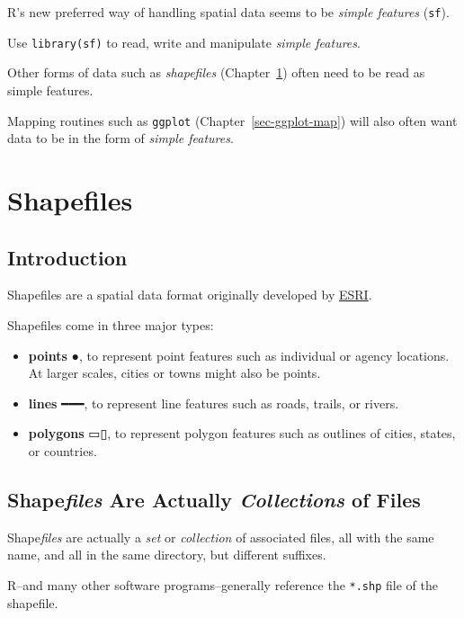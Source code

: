 \documentclass[
  letterpaper,
  DIV=11,
  numbers=noendperiod,
  oneside]{scrreprt}
\providecommand{\tightlist}{%
  \setlength{\itemsep}{0pt}\setlength{\parskip}{0pt}}\usepackage{longtable,booktabs,array}
\begin{document}
R's new preferred way of handling spatial data seems to be \emph{simple
features} (\texttt{sf}).

Use \texttt{library(sf)} to read, write and manipulate \emph{simple
features}.

Other forms of data such as \emph{shapefiles}
(Chapter~\ref{sec-shapefiles}) often need to be read as simple features.

Mapping routines such as \texttt{ggplot} (Chapter~\ref{sec-ggplot-map})
will also often want data to be in the form of \emph{simple features}.

\chapter{Shapefiles}\label{sec-shapefiles}

\section{Introduction}\label{introduction-2}

Shapefiles are a spatial data format originally developed by
\href{https://www.esri.com/en-us/home}{ESRI}.

Shapefiles come in three major types:

\begin{itemize}
\tightlist
\item
  \textbf{points} {●}, to represent point features such as individual or
  agency locations. At larger scales, cities or towns might also be
  points.
\item
  \textbf{lines}️ {━━━}, to represent line features such as roads,
  trails, or rivers.
\item
  \textbf{polygons} {▭▯}, to represent polygon features such as outlines
  of cities, states, or countries.
\end{itemize}

\section{\texorpdfstring{Shape\emph{files} Are Actually
\emph{Collections} of
Files}{Shapefiles Are Actually Collections of Files}}\label{shapefiles-are-actually-collections-of-files}

Shape\emph{files} are actually a \emph{set} or \emph{collection} of
associated files, all with the same name, and all in the same directory,
but different suffixes.

R--and many other software programs--generally reference the
\texttt{*.shp} file of the shapefile.
\end{document}
